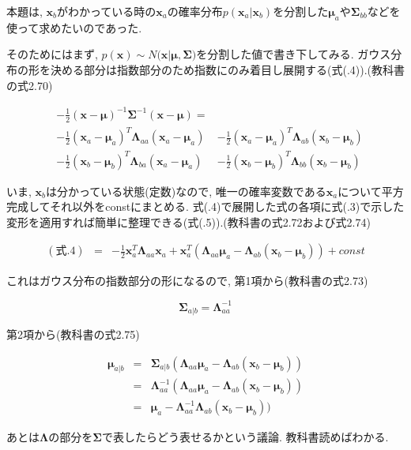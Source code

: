 本題は, $\bm{x}_b$がわかっている時の$\bm{x}_a$の確率分布$p(\bm{x}_a | \bm{x}_b)$を分割した$\bm{\mu}_a$や$\bm{\Sigma}_{bb}$などを使って求めたいのであった.

そのためにはまず, $p(\bm{x}) \sim N(\bm{x}|\bm{\mu}, \bm{\Sigma)}$を分割した値で書き下してみる. ガウス分布の形を決める部分は指数部分のため指数にのみ着目し展開する(式(.4)).(教科書の式2.70)

\begin{eqnarray}
    &-\frac{1}{2}(\bm{x} - \bm{\mu})^{-1}\bm{\Sigma}^{-1}(\bm{x} - \bm{\mu}) =& \nonumber \\ 
    &-\frac{1}{2}(\bm{x}_{a} - \bm{\mu}_{a})^{T}\bm{\Lambda}_{aa}(\bm{x}_{a} - \bm{\mu}_{a})& - \frac{1}{2}(\bm{x}_{a} - \bm{\mu}_{a})^{T}\bm{\Lambda}_{ab}(\bm{x}_{b} - \bm{\mu}_{b}) \nonumber \\
    &-\frac{1}{2}(\bm{x}_{b} - \bm{\mu}_{b})^{T}\bm{\Lambda}_{ba}(\bm{x}_{a} - \bm{\mu}_{a})& - \frac{1}{2}(\bm{x}_{b} - \bm{\mu}_{b})^{T}\bm{\Lambda}_{bb}(\bm{x}_{b} - \bm{\mu}_{b})
\end{eqnarray}

いま, $\bm{x}_b$は分かっている状態(定数)なので, 唯一の確率変数である$\bm{x}_a$について平方完成してそれ以外をconstにまとめる. 式(.4)で展開した式の各項に式(.3)で示した変形を適用すれば簡単に整理できる(式(.5)).(教科書の式2.72および式2.74)

\begin{eqnarray}
    ({式}.4) &=& -\frac{1}{2}\bm{x}_a^T\bm{\Lambda}_{aa}\bm{x}_a + \bm{x}_a^T(\bm{\Lambda}_{aa}\bm{\mu}_a - \bm{\Lambda}_{ab}(\bm{x}_b - \bm{\mu}_b)) + const
\end{eqnarray}

これはガウス分布の指数部分の形になるので, 第1項から(教科書の式2.73)

$$ \bm{\Sigma}_{a|b} = \bm{\Lambda}_{aa}^{-1} $$

第2項から(教科書の式2.75)

\begin{eqnarray}
    \bm{\mu}_{a|b} &=& \bm{\Sigma}_{a|b}(\bm{\Lambda}_{aa}\bm{\mu}_a - \bm{\Lambda}_{ab}(\bm{x}_b - \bm{\mu}_b)) \nonumber \\
    &=& \bm{\Lambda}_{aa}^{-1}(\bm{\Lambda}_{aa}\bm{\mu}_a - \bm{\Lambda}_{ab}(\bm{x}_b - \bm{\mu}_b)) \nonumber \\
    &=& \bm{\mu}_a - \bm{\Lambda}_{aa}^{-1}\bm{\Lambda}_{ab}(\bm{x}_b - \bm{\mu}_b)) \nonumber
\end{eqnarray}

あとは$\bm{\Lambda}$の部分を$\bm{\Sigma}$で表したらどう表せるかという議論. 教科書読めばわかる.